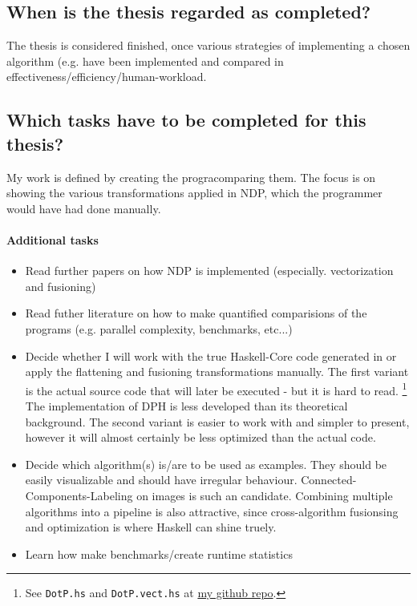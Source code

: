 \documentclass{article}
\begin{document}
    \subsection{When is the thesis regarded as completed?}
    The thesis is considered finished, once various strategies of
    implementing a chosen algorithm (e.g.  have been
    implemented and compared in effectiveness/efficiency/human-workload.

    \subsection{Which tasks have to be completed for this thesis?}
    My work is defined by creating the progracomparing them.
    The focus is on showing the various transformations applied in NDP, which the programmer would have had done manually.













    \paragraph{Additional tasks}
        \begin{itemize}
            \item Read further papers on how NDP is implemented (especially. vectorization and fusioning)
            \item Read futher literature on how to make quantified comparisions of the programs (e.g. parallel complexity, benchmarks, etc...)
            \item Decide whether I will work with the true Haskell-Core code generated in    or apply the flattening and fusioning transformations manually.
                The first variant is the actual source code that will later be executed - but it is hard to read. \footnote[1]{See \texttt{DotP.hs} and \texttt{DotP.vect.hs} at \href{https://github.com/GollyTicker/Nested-Data-Parallel-Haskell/tree/0e8d3df0d8084a01b007b27debda2b64247a254d}{my github repo}. }
                The implementation of DPH is less developed than its theoretical background.
                The second variant is easier to work with and simpler to present, however it will almost certainly be less optimized than the actual code.
            \item Decide which algorithm(s) is/are to be used as examples. They should be easily visualizable and should have irregular behaviour.
                Connected-Components-Labeling on images is such an candidate. Combining multiple algorithms into
                a pipeline is also attractive, since cross-algorithm fusionsing and optimization is where Haskell can shine truely.
            \item Learn how make benchmarks/create runtime statistics
        \end{itemize}
\end{document}

